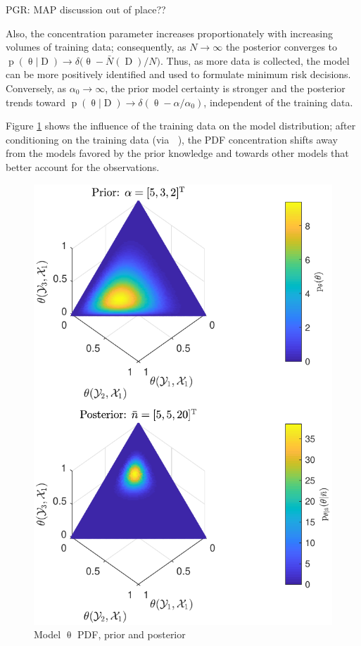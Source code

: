 \documentclass[12pt]{report}
\DeclareMathOperator{\Drm}{\mathrm{D}}
\DeclareMathOperator{\nbarrm}{\bar{\mathrm{n}}}
\DeclareMathOperator{\prm}{\mathrm{p}}
\begin{document}
PGR: MAP discussion out of place??

Also, the concentration parameter increases proportionately with increasing volumes of training data; consequently, as $N \to \infty$ the posterior converges to $\prm(\uptheta | \Drm) \to \delta\big( \uptheta - \bar{N}(\Drm) / N \big)$. Thus, as more data is collected, the model can be more positively identified and used to formulate minimum risk decisions. Conversely, as $\alpha_0 \to \infty$, the prior model certainty is stronger and the posterior trends toward $\prm(\uptheta | \Drm) \to \delta( \uptheta - \alpha / \alpha_0)$, independent of the training data.

Figure \ref{fig:P_theta_D} shows the influence of the training data on the model distribution; after conditioning on the training data (via $\nbarrm$), the PDF concentration shifts away from the models favored by the prior knowledge and towards other models that better account for the observations.

\begin{figure}
\centering
\includegraphics[width=0.8\linewidth]{P_theta_post.pdf}
\caption{Model $\uptheta$ PDF, prior and posterior}
\label{fig:P_theta_D}
\end{figure}
\end{document}
